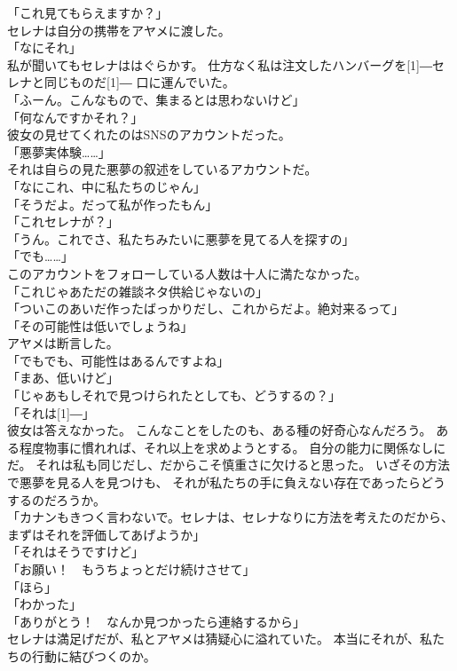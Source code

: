 \documentclass[../IHMain]{subfiles}
\begin{document}
「これ見てもらえますか？」\\
セレナは自分の携帯をアヤメに渡した。\\
「なにそれ」\\
私が聞いてもセレナははぐらかす。
仕方なく私は注文したハンバーグを\scalebox{3}[1]{―}セレナと同じものだ\scalebox{3}[1]{―}
口に運んでいた。\\
「ふーん。こんなもので、集まるとは思わないけど」\\
「何なんですかそれ？」\\
彼女の見せてくれたのはSNSのアカウントだった。\\
「悪夢実体験……」\\
それは自らの見た悪夢の叙述をしているアカウントだ。\\
「なにこれ、中に私たちのじゃん」\\
「そうだよ。だって私が作ったもん」\\
「これセレナが？」\\
「うん。これでさ、私たちみたいに悪夢を見てる人を探すの」\\
「でも……」\\
このアカウントをフォローしている人数は十人に満たなかった。\\
「これじゃあただの雑談ネタ供給じゃないの」\\
「ついこのあいだ作ったばっかりだし、これからだよ。絶対来るって」\\
「その可能性は低いでしょうね」\\
アヤメは断言した。\\
「でもでも、可能性はあるんですよね」\\
「まあ、低いけど」\\
「じゃあもしそれで見つけられたとしても、どうするの？」\\
「それは\scalebox{3}[1]{―}」\\
彼女は答えなかった。
こんなことをしたのも、ある種の好奇心なんだろう。
ある程度物事に慣れれば、それ以上を求めようとする。
自分の能力に関係なしにだ。
それは私も同じだし、だからこそ慎重さに欠けると思った。
いざその方法で悪夢を見る人を見つけも、
それが私たちの手に負えない存在であったらどうするのだろうか。\\
「カナンもきつく言わないで。セレナは、セレナなりに方法を考えたのだから、
まずはそれを評価してあげようか」\\
「それはそうですけど」\\
「お願い！　もうちょっとだけ続けさせて」\\
「ほら」\\
「わかった」\\
「ありがとう！　なんか見つかったら連絡するから」\\
セレナは満足げだが、私とアヤメは猜疑心に溢れていた。
本当にそれが、私たちの行動に結びつくのか。
\end{document}
